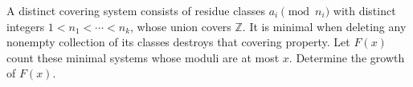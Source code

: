 A distinct covering system consists of residue classes $a_i\pmod{n_i}$ with distinct integers $1<n_1<\cdots<n_k$, whose union covers $\mathbb Z$. It is minimal when deleting any nonempty collection of its classes destroys that covering property. Let $F(x)$ count these minimal systems whose moduli are at most $x$. Determine the growth of $F(x)$.
